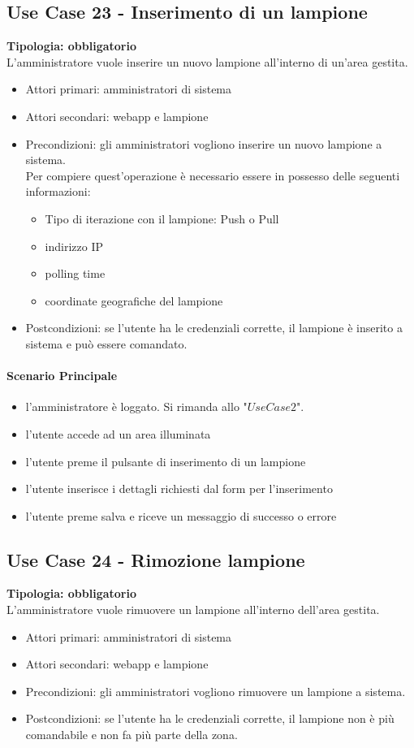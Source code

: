 \documentclass[12pt]{article}
\begin{document}
\subsection{Use Case 23 - Inserimento di un lampione}
\textbf{Tipologia: obbligatorio}\\
L'amministratore vuole inserire un nuovo lampione all'interno di un'area gestita.
\begin{itemize}
	\item Attori primari: amministratori di sistema
	\item Attori secondari: webapp e lampione
	\item Precondizioni: gli amministratori vogliono inserire un nuovo lampione a sistema.\\
	 Per compiere quest'operazione è necessario essere in possesso delle seguenti informazioni: 
	\begin{itemize}
		\item Tipo di iterazione con il lampione: Push o Pull
		\item indirizzo IP
		\item polling time
		\item coordinate geografiche del lampione
	\end{itemize}
	\item Postcondizioni: se l'utente ha le credenziali corrette, il lampione è inserito a sistema e può essere comandato.
\end{itemize}
\paragraph{Scenario Principale}
\begin{itemize}
	\item l'amministratore è loggato. Si rimanda allo "$Use Case 2$".
	\item l'utente accede ad un area illuminata
	\item l'utente preme il pulsante di inserimento di un lampione
	\item l'utente inserisce i dettagli richiesti dal form per l'inserimento
	\item l'utente preme salva e riceve un messaggio di successo o errore
\end{itemize}

\subsection{Use Case 24 - Rimozione lampione}
\textbf{Tipologia: obbligatorio}\\
L'amministratore vuole rimuovere un lampione all'interno dell'area gestita.
\begin{itemize}
	\item Attori primari: amministratori di sistema
	\item Attori secondari: webapp e lampione
	\item Precondizioni: gli amministratori vogliono rimuovere un lampione a sistema.\\
	\item Postcondizioni: se l'utente ha le credenziali corrette, il lampione non è più comandabile e non fa più parte della zona.
\end{itemize}
\end{document}
